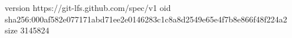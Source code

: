 version https://git-lfs.github.com/spec/v1
oid sha256:000af582e077171abd71ee2e0146283c1c8a8d2549e65e4f7b8e866f48f224a2
size 3145824
